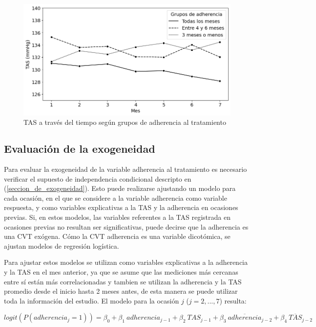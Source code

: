 \documentclass[spanish]{article}
\numberwithin{figure}{subsection}
\numberwithin{equation}{subsection}
\numberwithin{table}{subsection}
\begin{document}
\begin{figure}[H]
	\centering
	\includegraphics[scale=0.5]{img/TAS_vs_tpo_with_adherencia.png}
	\caption{TAS a través del tiempo según grupos de adherencia al tratamiento}
	\label{TAS_with_adh}
\end{figure}

\subsection{Evaluación de la exogeneidad}
\label{evaluacion de la exogeneidad}

Para evaluar la exogeneidad de la variable adherencia al tratamiento es
necesario verificar el supuesto de independencia condicional descripto en
(\ref{seccion_de_exogeneidad}). Esto puede realizarse ajustando un modelo para
cada ocasión, en el que se considere a la variable adherencia como variable
respuesta, y como variables explicativas a la TAS y la adherencia en ocasiones
previas. Si, en estos modelos, las variables referentes a la TAS registrada en
ocasiones previas no resultan ser significativas, puede decirse que la
adherencia es una CVT exógena. Cómo la CVT adherencia es una variable
dicotómica, se ajustan modelos de regresión logística.

Para ajustar estos modelos se utilizan como variables explicativas a la
adherencia y la TAS en el mes anterior, ya que se asume que las mediciones más
cercanas entre sí están más correlacionadas y tambien se utilizan la adherencia
y la TAS promedio desde el inicio hasta 2 meses antes, de esta manera se puede
utilizar toda la información del estudio. El modelo para la ocasión $j$
($j = 2, ..., 7$) resulta:

$ 
	logit(P(adherencia_j=1)) = \beta_0 + \beta_1\ adherencia_{j-1} + \beta_2\ TAS_{j-1}
	+ \beta_3\ \overline{adherencia}_{j-2} + \beta_4\ \overline{TAS}_{j-2}
$
\end{document}
